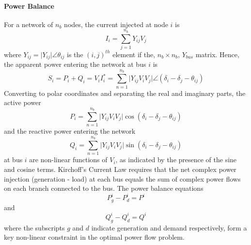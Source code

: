 \paragraph{Power Balance}
For a network of $n_b$ nodes, the current injected at
node $i$ is
\begin{equation}
I_i = \sum_{j=1}^{n_b} Y_{ij} V_j
\end{equation}
where $Y_{ij} = \vert Y_{ij}\vert \angle\theta_{ij}$ is the $(i,j)^{th}$ element
if the, $n_b \times n_b$, $Y_{bus}$ matrix.  Hence, the apparent power entering
the network at bus $i$ is
\begin{equation}
S_i = P_i+Q_i = V_iI_i^* = \sum_{n=1}^{n_b} \vert Y_{ij}V_iV_j \vert \angle
(\delta_i - \delta_j - \theta_{ij})
\end{equation}
Converting to polar coordinates and separating the real and imaginary parts,
the active power
\begin{equation}
P_i = \sum_{n=1}^{n_b} \vert Y_{ij}V_iV_j \vert \cos(\delta_i - \delta_j -
\theta_{ij})
\end{equation}
and the reactive power entering the network
\begin{equation}
Q_i = \sum_{n=1}^{n_b} \vert Y_{ij}V_iV_j \vert \sin(\delta_i - \delta_j -
\theta_{ij})
\end{equation}
at bus $i$ are non-linear functions of $V_i$, as indicated by the presence of
the sine and cosine terms.  Kirchoff's Current Law requires that the net
complex power injection (generation - load) at each bus equals the sum of
complex power flows on each branch connected to the bus.  The power balance
equations
\begin{equation}
\label{eq:p_balance}
P_g^i - P_d^i = P^i
\end{equation}
and
\begin{equation}
\label{eq:q_balance}
Q_g^i - Q_d^i = Q^i
\end{equation}
where the subscripts $g$ and $d$ indicate generation and demand
respectively, form a key non-linear constraint in the optimal power flow
problem.

